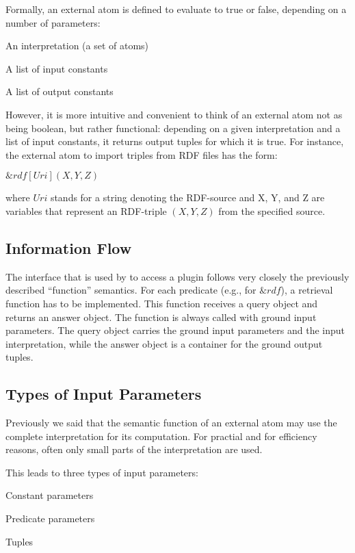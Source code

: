 \documentclass[a4paper, titlepage]{article}
\newcommand{\mi}[1]{\mathit{#1}}
\newcommand{\amp}[1]{\ensuremath{\&{\mathit{#1}}}}
\newcommand{\ext}[3]{\ensuremath{\&{\mathit{#1}}[#2](#3)}}
\newcommand\mycenterline[1]{\par\smallskip\centerline{#1} \smallskip}
\begin{document}
Formally, an external atom is defined to evaluate to true
or false, depending on a number of parameters:
\begin{compactitem}
\item An interpretation (a set of atoms)
\item A list of input constants
\item A list of output constants
\end{compactitem}  
However, it is more intuitive and convenient to think of an 
external atom not as being boolean, but rather functional:
depending on a given interpretation and a list of input 
constants, it returns output tuples for which it is true. For instance, the 
external atom to import triples from RDF files has the 
form:
\mycenterline{$\ext{rdf}{\mi{Uri}}{X,Y,Z}$} 
\noindent
where $\mathit{Uri}$ stands for a string denoting the RDF-source and X, Y, and Z are variables that represent an RDF-triple $(X,Y,Z)$ from the specified source.

\subsection{Information Flow}
The interface that is used by \dlvhex{} to access a plugin 
follows very closely the previously described ``function'' semantics.
For each predicate (e.g., for $\amp{rdf}$),
a retrieval function has to be implemented.
This function receives a query object and returns an answer object.
The function is always called with ground input parameters.
The query object carries the ground input parameters
and the input interpretation, 
while the answer object is a container for the ground output 
tuples.

\subsection{Types of Input Parameters}
\label{inputparamtypes}

Previously we said that the semantic function of an external atom
may use the complete interpretation for its computation.
For practial and for efficiency reasons,
often only small parts of the interpretation are used.

This leads to three types of input parameters: 
\begin{compactitem}
\item Constant parameters
\item Predicate parameters
\item Tuples
\end{compactitem}
\end{document}
